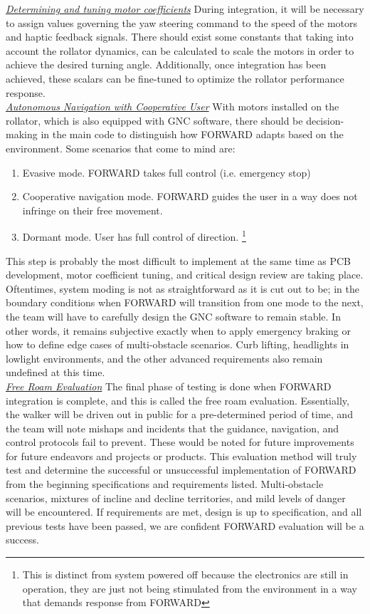 \noindent \underline{\textit{Determining and tuning motor coefficients}} During integration, it will be necessary to assign values governing the yaw steering command to the speed of the motors and haptic feedback signals. There should exist some constants that taking into account the rollator dynamics, can be calculated to scale the motors in order to achieve the desired turning angle. Additionally, once integration has been achieved, these scalars can be fine-tuned to optimize the rollator performance response.\\

\noindent \underline{\textit{Autonomous Navigation with Cooperative User}}
\noindent With motors installed on the rollator, which is also equipped with GNC software, there should be decision-making in the main code to distinguish how FORWARD adapts based on the environment. Some scenarios that come to mind are:
\begin{enumerate}
	\item Evasive mode. FORWARD takes full control (i.e. emergency stop)
	\item Cooperative navigation mode. FORWARD guides the user in a way does not infringe on their free movement.
	\item Dormant mode. User has full control of direction. \footnote{This is distinct from system powered off because the electronics are still in operation, they are just not being stimulated from the environment in a way that demands response from FORWARD}
\end{enumerate}
This step is probably the most difficult to implement at the same time as PCB development, motor coefficient tuning, and critical design review are taking place. Oftentimes, system moding is not as straightforward as it is cut out to be; in the boundary conditions when FORWARD will transition from one mode to the next, the team will have to carefully design the GNC software to remain stable. In other words, it remains subjective exactly when to apply emergency braking or how to define edge cases of multi-obstacle scenarios. Curb lifting, headlights in lowlight environments, and the other advanced requirements also remain undefined at this time.\\

\noindent \underline{\textit{Free Roam Evaluation}}
\noindent The final phase of testing is done when FORWARD integration is complete, and this is called the free roam evaluation. Essentially, the walker will be driven out in public for a pre-determined period of time, and the team will note mishaps and incidents that the guidance, navigation, and control protocols fail to prevent. These would be noted for future improvements for future endeavors and projects or products. This evaluation method will truly test and determine the successful or unsuccessful implementation of FORWARD from the beginning specifications and requirements listed. Multi-obstacle scenarios, mixtures of incline and decline territories, and mild levels of danger will be encountered. If requirements are met, design is up to specification, and all previous tests have been passed, we are confident FORWARD evaluation will be a success.\\

